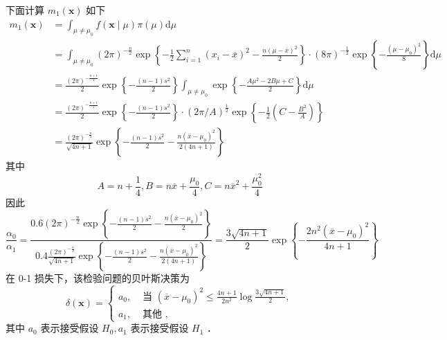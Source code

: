 \documentclass[UTF8]{ctexart}
\begin{document}
下面计算 $m_1(\boldsymbol{x})$ 如下
$$
\begin{aligned}
	m_1(\boldsymbol{x}) & =\int_{\mu \neq \mu_0} f(\boldsymbol{x} \mid \mu) \pi(\mu) \mathrm{d} \mu \\
	& =\int_{\mu \neq \mu_0}(2 \pi)^{-\frac{n}{2}} \exp \left\{-\frac{1}{2} \sum_{i=1}^n\left(x_i-\overline{x}\right)^2-\frac{n(\mu-\overline{x})^2}{2}\right\} \cdot(8 \pi)^{-\frac{1}{2}} \exp \left\{-\frac{\left(\mu-\mu_0\right)^2}{8}\right\} \mathrm{d} \mu \\
	& =\frac{(2 \pi)^{-\frac{n+1}{2}}}{2} \exp \left\{-\frac{(n-1) s^2}{2}\right\} \int_{\mu \neq \mu_0} \exp \left\{-\frac{A \mu^2-2 B \mu+C}{2}\right\} \mathrm{d} \mu \\
	& =\frac{(2 \pi)^{-\frac{n+1}{2}}}{2} \exp \left\{-\frac{(n-1) s^2}{2}\right\} \cdot(2 \pi / A)^{\frac{1}{2}} \exp \left\{-\frac{1}{2}\left(C-\frac{B^2}{A}\right)\right\} \\
	& =\frac{(2 \pi)^{-\frac{n}{2}}}{\sqrt{4 n+1}} \exp \left\{-\frac{(n-1) s^2}{2}-\frac{n\left(\overline{x}-\mu_0\right)^2}{2(4 n+1)}\right\}
\end{aligned}
$$
其中 
$$A=n+\frac{1}{4}, B=n \overline{x}+\frac{\mu_0}{4}, C=n \overline{x}^2+\frac{\mu_0^2}{4}$$
因此
$$
\frac{\alpha_0}{\alpha_1}=\frac{0.6(2 \pi)^{-\frac{n}{2}} \exp \left\{-\frac{(n-1) s^2}{2}-\frac{n\left(\overline{x}-\mu_0\right)^2}{2}\right\}}{0.4 \frac{(2 \pi)^{-\frac{n}{2}}}{\sqrt{4 n+1}} \exp \left\{-\frac{(n-1) s^2}{2}-\frac{n\left(\overline{x}-\mu_0\right)^2}{2(4 n+1)}\right\}}=\frac{3 \sqrt{4 n+1}}{2} \exp \left\{-\frac{2 n^2\left(\overline{x}-\mu_0\right)^2}{4 n+1}\right\}
$$
在 0-1 损失下，该检验问题的贝叶斯决策为
$$
\delta(\boldsymbol{x})= \begin{cases}a_0, & \text { 当 }\left(\overline{x}-\mu_0\right)^2 \leq \frac{4 n+1}{2 n^2} \log \frac{3 \sqrt{4 n+1}}{2}, \\ a_1, & \text { 其他 },\end{cases}
$$
其中 $a_0$ 表示接受假设 $H_0, a_1$ 表示接受假设 $H_1$ ．\\
\end{document}
